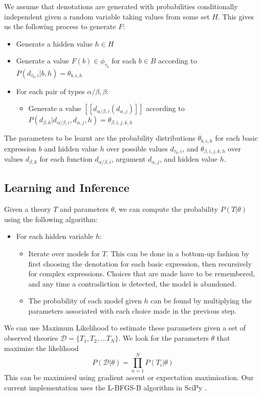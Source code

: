 \documentclass[11pt]{article}
\theoremstyle{definition}
\newcommand{\interp}[1]{[\![ #1 ]\!]}
\begin{document}
We assume that denotations are generated with probabilities
conditionally independent given a random variable taking values from
some set $H$. This gives us the following process to generate $F$:
\begin{itemize}
\item Generate a hidden value $h\in H$
\item Generate a value $F(b) \in \phi_{\tau_b}$ for each $b\in B$ according to
  $P(d_{\tau_b,i}|b, h) = \theta_{b,i,h}$
\item For each pair of types $\alpha/\beta, \beta$:
\begin{itemize}
\item Generate a value $\interp{d_{\alpha/\beta,i}(d_{\alpha,j})}$
  according to $P(d_{\beta,k}|d_{\alpha/\beta,i}, d_{\alpha,j},h) = \theta_{\beta,i,j,k,h}$
\end{itemize}
\end{itemize}
The parameters to be learnt are the probability distributions
$\theta_{b,i,h}$ for each basic expression $b$ and hidden value $h$
over possible values $d_{\tau_b,i}$, and $\theta_{\beta,i,j,k,h}$ over
values $d_{\beta,k}$ for each function $d_{\alpha/\beta,i}$, argument
$d_{\alpha,j}$, and hidden value $h$.

\subsection{Learning and Inference}

Given a theory $T$ and parameters $\theta$, we can compute the
probability $P(T|\theta)$ using the following algorithm:
\begin{itemize}
\item For each hidden variable $h$:
\begin{itemize}
\item Iterate over models for $T$. This can be done in a bottom-up
  fashion by first choosing the denotation for each basic expression,
  then recursively for complex expressions. Choices that are made have
  to be remembered, and any time a contradiction is detected, the
  model is abandoned.
\item The probability of each model given $h$ can be found by
  multiplying the parameters associated with each choice made in the
  previous step.
\end{itemize}
\end{itemize}

We can use Maximum Likelihood to estimate these parameters given a set
of observed theories $\mathcal{D} = \{T_1, T_2, \ldots T_N\}$. We look
for the parameters $\theta$ that maximize the likelihood
$$P(\mathcal{D}|\theta) = \prod_{n=1}^N P(T_i|\theta)$$
This can be maximised using gradient ascent or expectation
maximisation. Our current implementation uses the L-BFGS-B algorithm
in SciPy \cite{Zhu:97}.
\end{document}
